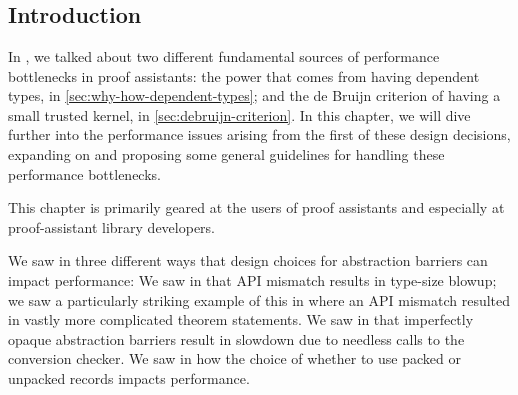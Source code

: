 \chapter{}\label{ch:design}\label{ch:api-design}\label{ch:abstraction}

\section{Introduction}
In , we talked about two different fundamental sources of performance bottlenecks in proof assistants:
the power that comes from having dependent types, in \autoref{sec:why-how-dependent-types};
and the de Bruijn criterion of having a small trusted kernel, in \autoref{sec:debruijn-criterion}.
In this chapter, we will dive further into the performance issues arising from the first of these design decisions, expanding on  and proposing some general guidelines for handling these performance bottlenecks.

This chapter is primarily geared at the users of proof assistants and especially at proof-assistant library developers.

We saw in  three different ways that design choices for abstraction barriers can impact performance:
We saw in  that API mismatch results in type-size blowup; we saw a particularly striking example of this in  where an API mismatch resulted in vastly more complicated theorem statements.
We saw in  that imperfectly opaque abstraction barriers result in slowdown due to needless calls to the conversion checker.
We saw in  how the choice of whether to use packed or unpacked records impacts performance.

